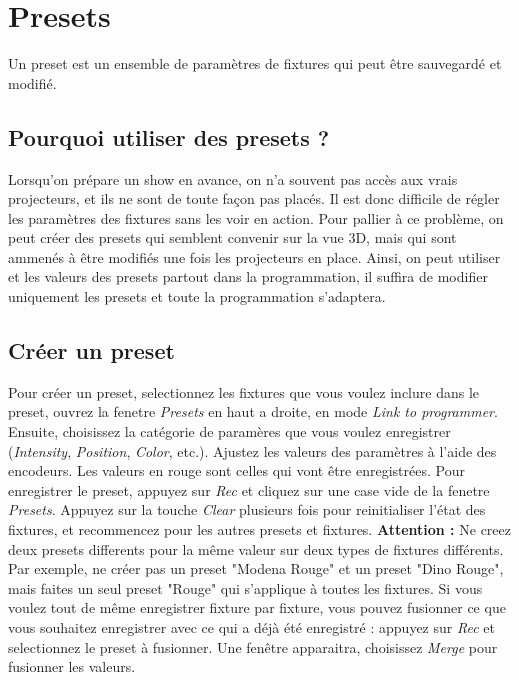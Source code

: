 \section{Presets}
\label{sec:presets}

Un preset est un ensemble de paramètres de fixtures qui peut être sauvegardé et modifié.

\subsection{Pourquoi utiliser des presets ?}
\label{subsec:presets_pourquoi}

Lorsqu'on prépare un show en avance, on n'a souvent pas accès aux vrais projecteurs, et ils ne sont de toute façon pas placés.
Il est donc difficile de régler les paramètres des fixtures sans les voir en action.
\newline
Pour pallier à ce problème, on peut créer des presets qui semblent convenir sur la vue 3D, mais qui sont ammenés à être modifiés une fois les projecteurs en place.
\newline
Ainsi, on peut utiliser et les valeurs des presets partout dans la programmation, il suffira de modifier uniquement les presets et toute la programmation s'adaptera.

\subsection{Créer un preset}
\label{subsec:presets_creer}

Pour créer un preset, selectionnez les fixtures que vous voulez inclure dans le preset,
ouvrez la fenetre \textit{Presets} en haut a droite, en mode \textit{Link to programmer}.
\newline
Ensuite, choisissez la catégorie de paramères que vous voulez enregistrer (\textit{Intensity}, \textit{Position}, \textit{Color}, etc.).
Ajustez les valeurs des paramètres à l'aide des encodeurs. Les valeurs en rouge sont celles qui vont être enregistrées.
\newline
Pour enregistrer le preset, appuyez sur \textit{Rec} et cliquez sur une case vide de la fenetre \textit{Presets}.
\newline
Appuyez sur la touche \textit{Clear} plusieurs fois pour reinitialiser l'état des fixtures, et recommencez pour les autres presets et fixtures.
\newline
\newline
\textbf{Attention :} Ne creez deux presets differents pour la même valeur sur deux types de fixtures différents.
Par exemple, ne créer pas un preset "Modena Rouge" et un preset "Dino Rouge", mais faites un seul preset "Rouge" qui s'applique à toutes les fixtures.
\newline
Si vous voulez tout de même enregistrer fixture par fixture, vous pouvez fusionner ce que vous souhaitez enregistrer avec ce qui a déjà été enregistré : appuyez sur \textit{Rec} et selectionnez le preset à fusionner.
Une fenêtre apparaitra, choisissez \textit{Merge} pour fusionner les valeurs.
\newline
\newline

